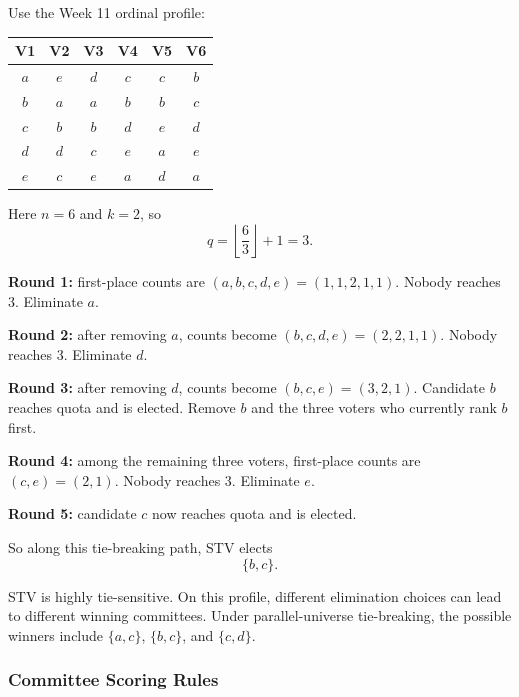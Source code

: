\begin{exbox}[Worked Example: STV with $k=2$]
Use the Week 11 ordinal profile:

\begin{center}
\renewcommand{\arraystretch}{1.15}
\begin{tabular}{@{}cccccc@{}}
\toprule
\textbf{V1} & \textbf{V2} & \textbf{V3} & \textbf{V4} & \textbf{V5} & \textbf{V6} \\
\midrule
$a$ & $e$ & $d$ & $c$ & $c$ & $b$ \\
$b$ & $a$ & $a$ & $b$ & $b$ & $c$ \\
$c$ & $b$ & $b$ & $d$ & $e$ & $d$ \\
$d$ & $d$ & $c$ & $e$ & $a$ & $e$ \\
$e$ & $c$ & $e$ & $a$ & $d$ & $a$ \\
\bottomrule
\end{tabular}
\end{center}

Here $n=6$ and $k=2$, so
\[
  q=\left\lfloor \frac{6}{3}\right\rfloor +1 = 3.
\]

\textbf{Round 1:} first-place counts are $(a,b,c,d,e)=(1,1,2,1,1)$. Nobody reaches 3. Eliminate $a$.

\textbf{Round 2:} after removing $a$, counts become $(b,c,d,e)=(2,2,1,1)$. Nobody reaches 3. Eliminate $d$.

\textbf{Round 3:} after removing $d$, counts become $(b,c,e)=(3,2,1)$. Candidate $b$ reaches quota and is elected. Remove $b$ and the three voters who currently rank $b$ first.

\textbf{Round 4:} among the remaining three voters, first-place counts are $(c,e)=(2,1)$. Nobody reaches 3. Eliminate $e$.

\textbf{Round 5:} candidate $c$ now reaches quota and is elected.

So along this tie-breaking path, STV elects
\[
  \{b,c\}.
\]
\end{exbox}

\begin{tipbox}
STV is highly tie-sensitive. On this profile, different elimination choices can lead to different winning committees. Under parallel-universe tie-breaking, the possible winners include $\{a,c\}$, $\{b,c\}$, and $\{c,d\}$.
\end{tipbox}

\separator

\subsubsection{Committee Scoring Rules}

